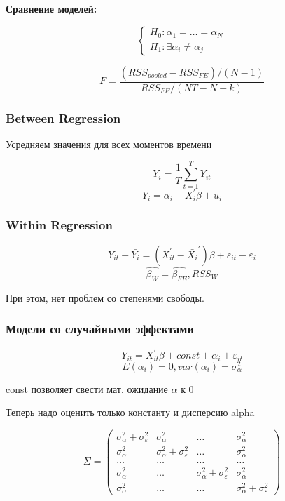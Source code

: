 \documentclass[a4paper, 12pt]{article}
\begin{document}
\textbf{Сравнение моделей:}

\[\begin{cases}
    H_0: \alpha_1 = \ldots = \alpha_N \\
    H_1: \exists \alpha_i \neq \alpha_j
\end{cases}\]

\[F = \frac{(RSS_{pooled} - RSS_{FE}) / (N - 1)}{RSS_{FE} / (NT - N - k)}\]

\subsubsection{Between Regression}

Усредняем значения для всех моментов времени

\[Y_{i} = \frac{1}{T}\sum_{t = 1}^{T}Y_{it}\]
\[Y_i = \alpha_i + X_i^\prime \beta + u_i\]

\subsubsection{Within Regression}

\[Y_{it} - \bar{Y_{i}} = (X_{it}^{\prime} - \bar{X_i}^{\prime})\beta + \varepsilon_{it} - \varepsilon_i\]
\[\hat{\beta_{W}} = \hat{\beta_{FE}}, RSS_{W}\]

При этом, нет проблем со степенями свободы.

\subsubsection{Модели со случайными эффектами}

\[Y_{it} = X_{it}^{\prime} \beta + const + \alpha_{i} + \varepsilon_{it}\]
\[E(\alpha_i) = 0, var(\alpha_i) = \sigma_{\alpha}^2\]

const позволяет свести мат. ожидание $\alpha$ к 0

Теперь надо оценить только константу и дисперсию alpha

\[\Sigma = \begin{pmatrix}
    \sigma_{\alpha}^2 + \sigma_{\varepsilon}^{2} & \sigma_{\alpha}^2 & \ldots & \sigma_{\alpha}^2 \\
    \sigma_{\alpha}^2 & \sigma_{\alpha}^2 + \sigma_{\varepsilon}^{2} & \ldots & \sigma_{\alpha}^2 \\
    \ldots & \ldots & \ldots & \ldots \\
    \sigma_{\alpha}^2 & \ldots & \sigma_{\alpha}^2 + \sigma_{\varepsilon}^{2} & \sigma_{\alpha}^2 \\
    \sigma_{\alpha}^2 & \ldots & \ldots & \sigma_{\alpha}^2 + \sigma_{\varepsilon}^{2}
\end{pmatrix}\]
\end{document}
